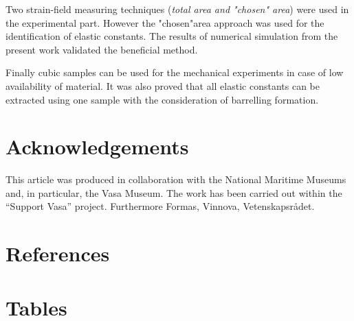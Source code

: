 \documentclass[review]{elsarticle}
\begin{document}
Two strain-field measuring techniques (\textit{total area and "chosen" area}) were used in the experimental part. However the "chosen"area approach was used for the identification of elastic constants. The results of numerical simulation from the present work validated the beneficial method.\par
Finally cubic samples can be used for the mechanical experiments in case of low
availability of material. It was also proved that all elastic constants can be extracted using one sample with the consideration of barrelling formation.


\section*{Acknowledgements}
This article was produced in collaboration with the National Maritime Museums
and, in particular, the Vasa Museum. The work has been carried
out within the ``Support Vasa'' project. Furthermore  Formas, Vinnova,
Vetenskapsr{\aa}det. \section*{References}



\pagebreak
\section*{Tables}
\end{document}
